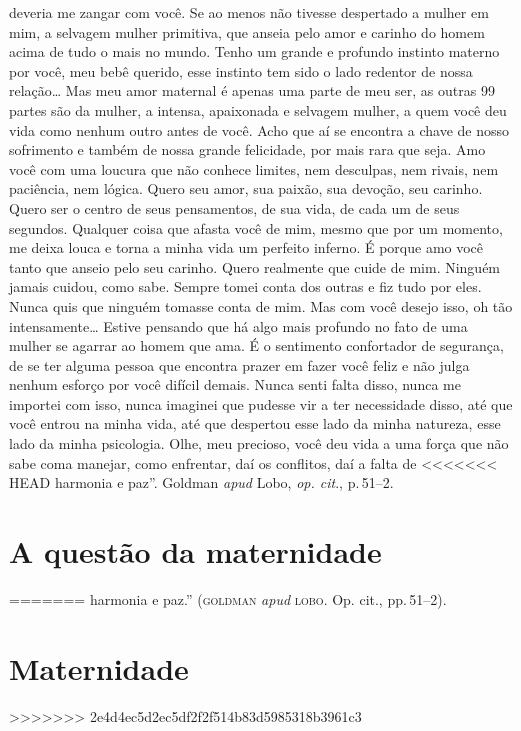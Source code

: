 {{  deveria me zangar com você. Se ao menos não tivesse despertado a
  mulher em mim, a selvagem mulher primitiva, que anseia pelo amor e
  carinho do homem acima de tudo o mais no mundo. Tenho um grande e
  profundo instinto materno por você, meu bebê querido, esse instinto
  tem sido o lado redentor de nossa relação\ldots{} Mas meu amor maternal é
  apenas uma parte de meu ser, as outras 99 partes são da mulher, a
  intensa, apaixonada e selvagem mulher, a quem você deu vida como
  nenhum outro antes de você. Acho que aí se encontra a chave de nosso
  sofrimento e também de nossa grande felicidade, por mais rara que
  seja. Amo você com uma loucura que não conhece limites, nem desculpas,
  nem rivais, nem paciência, nem lógica. Quero seu amor, sua paixão, sua
  devoção, seu carinho. Quero ser o centro de seus pensamentos, de sua
  vida, de cada um de seus segundos. Qualquer coisa que afasta você de
  mim, mesmo que por um momento, me deixa louca e torna a minha vida um
  perfeito inferno. É porque amo você tanto que anseio pelo seu carinho.
  Quero realmente que cuide de mim. Ninguém jamais cuidou, como sabe.
  Sempre tomei conta dos outras e fiz tudo por eles. Nunca quis que
  ninguém tomasse conta de mim. Mas com você desejo isso, oh tão
  intensamente\ldots{} Estive pensando que há algo mais profundo no fato de
  uma mulher se agarrar ao homem que ama. É o sentimento confortador de
  segurança, de se ter alguma pessoa que encontra prazer em fazer você
  feliz e não julga nenhum esforço por você difícil demais. Nunca senti
  falta disso, nunca me importei com isso, nunca imaginei que pudesse
  vir a ter necessidade disso, até que você entrou na minha vida, até
  que despertou esse lado da minha natureza, esse lado da minha
  psicologia. Olhe, meu precioso, você deu vida a uma força que não sabe
  coma manejar, como enfrentar, daí os conflitos, daí a falta de
<<<<<<< HEAD
  harmonia e paz''. Goldman \emph{apud} Lobo, \textit{op. cit}., p.\,51--2.}

\section{A questão da maternidade}
=======
  harmonia e paz.'' (\textsc{goldman} \textit{apud} \textsc{lobo}. Op. cit., pp.\,51--2).}

\section{Maternidade}
>>>>>>> 2e4d4ec5d2ec5df2f2f514b83d5985318b3961c3

